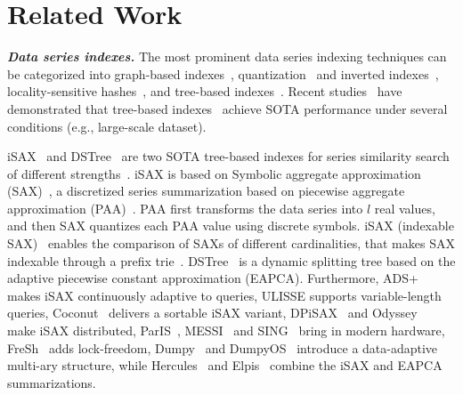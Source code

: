 \section{Related Work}
\label{sec-related-work}

\noindent \textbf{\textit{Data series indexes.}}
\label{sec-lit-index}
The most prominent data series indexing techniques can be categorized into graph-based indexes~\cite{DBLP:journals/pami/MalkovY20}, 
quantization~\cite{DBLP:journals/pami/GeHK014} and inverted indexes~\cite{DBLP:journals/pami/BabenkoL15}, 
locality-sensitive hashes~\cite{DBLP:journals/pvldb/HuangFZFN15},
and tree-based indexes~\cite{DBLP:conf/kdd/ShiehK08,DBLP:journals/pvldb/WangWPWH13}. 
Recent studies~\cite{DBLP:journals/pvldb/EchihabiZPB18, DBLP:journals/pvldb/EchihabiZPB19} have demonstrated that tree-based indexes~\cite{DBLP:conf/icde/PengFP20} achieve SOTA performance under several conditions (e.g., large-scale dataset).

iSAX~\cite{DBLP:conf/kdd/ShiehK08} and DSTree~\cite{DBLP:journals/pvldb/WangWPWH13} are two SOTA tree-based indexes for series similarity search of different strengths~\cite{DBLP:journals/pvldb/EchihabiZPB18, DBLP:journals/pvldb/EchihabiZPB19}.
iSAX is based on Symbolic aggregate approximation (SAX)~\cite{DBLP:conf/kdd/ShiehK08}, a discretized series summarization based on piecewise aggregate approximation (PAA)~\cite{DBLP:conf/sigmod/KeoghCMP01}.
PAA first transforms the data series into $l$ real values, and then SAX quantizes each PAA value using discrete symbols. 
iSAX (indexable SAX)~\cite{DBLP:conf/kdd/ShiehK08} enables the comparison of SAXs of different cardinalities, that makes SAX indexable through a prefix trie~\cite{DBLP:conf/aieeire/Briandais59}. 
DSTree~\cite{DBLP:journals/pvldb/WangWPWH13} is a dynamic splitting tree based on the adaptive piecewise constant approximation (EAPCA).
Furthermore, 
ADS+~\cite{DBLP:conf/sigmod/ZoumpatianosIP14} makes iSAX continuously adaptive to queries, 
ULISSE\cite{DBLP:journals/pvldb/LinardiP18,DBLP:journals/vldb/LinardiP20} supports variable-length queries, 
Coconut~\cite{DBLP:journals/pvldb/KondylakisDZP18} delivers a sortable iSAX variant, 
DPiSAX~\cite{DBLP:conf/icdm/YagoubiAMP17} and Odyssey~\cite{DBLP:journals/pvldb/ChatzakisFKPP23} make iSAX distributed, 
ParIS~\cite{DBLP:journals/tkde/PengFP21}, MESSI~\cite{DBLP:conf/icde/PengFP20,messijournal} and SING~\cite{DBLP:conf/icde/PengFP21} bring in modern hardware, FreSh~\cite{DBLP:conf/srds/FatourouKPP23} adds lock-freedom, 
Dumpy~\cite{DBLP:journals/pacmmod/Wang0WP023} and DumpyOS~\cite{DBLP:journals/vldb/WangWWPW24} introduce a data-adaptive multi-ary structure, 
while Hercules~\cite{DBLP:journals/pvldb/EchihabiFZPB22} and Elpis~\cite{DBLP:journals/pvldb/AziziEP23} combine the iSAX and EAPCA~\cite{DBLP:journals/pvldb/WangWPWH13} summarizations.

